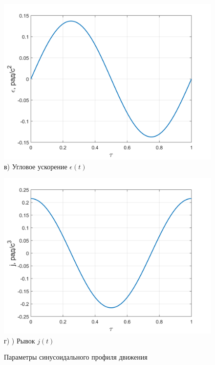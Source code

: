 \begin{figure}[h!]
	\begin{minipage}[b]{0.49\linewidth}\centering
		\includegraphics[width=\linewidth]{matlab/img/eps_sin} \\ в) Угловое ускорение $\epsilon(t)$
	\end{minipage}
	\hfill
	\begin{minipage}[b]{0.49\linewidth}\centering
		\includegraphics[width=\linewidth]{matlab/img/jerk_sin} \\ г) ) Рывок $j(t)$
	\end{minipage}
	
	\caption{Параметры синусоидального профиля движения}
	\label{fig:sin-profile}
\end{figure}

